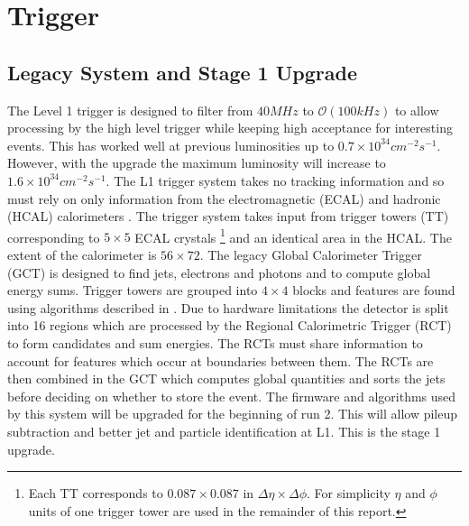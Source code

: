
\chapter{Trigger} %

\label{Chapter4} %



\section{Legacy System and Stage 1 Upgrade}
The Level 1 trigger is designed to filter from $40MHz$ to $\mathcal{O}(100kHz)$ to allow processing by the high level trigger while keeping high acceptance for interesting events. This has worked well at previous luminosities up to $0.7\times10^{34} cm^{-2}s^{-1}$. However, with the upgrade the maximum luminosity will increase to $1.6\times10^{34} cm^{-2}s^{-1}$. The L1 trigger system takes no tracking information and so must rely on only information from the electromagnetic (ECAL) and hadronic (HCAL) calorimeters \cite{gct}. The trigger system takes input from  trigger towers (TT) corresponding to $5\times5$ ECAL crystals \footnote{Each TT corresponds to $0.087\times0.087$ in $\Delta\eta\times\Delta\phi$. For simplicity $\eta$ and $\phi$ units of one trigger tower are used in the remainder of this report.} and an identical area in the HCAL. The extent of the calorimeter is $56\times72$. The legacy Global Calorimeter Trigger (GCT) is designed to find jets, electrons and photons and to compute global energy sums. Trigger towers are grouped into $4\times4$ blocks and features are found using algorithms described in \cite{gctalgo}. Due to hardware limitations the detector is split into 16 regions which are processed by the Regional Calorimetric Trigger (RCT) to form candidates and sum energies. The RCTs must share information to account for features which occur at boundaries between them. The RCTs are then combined in the GCT which computes global quantities and sorts the jets before deciding on whether to store the event. The firmware and algorithms used by this system will be upgraded for the beginning of run 2. This will allow pileup subtraction and better jet and particle identification at L1. This is the stage 1 upgrade. 
